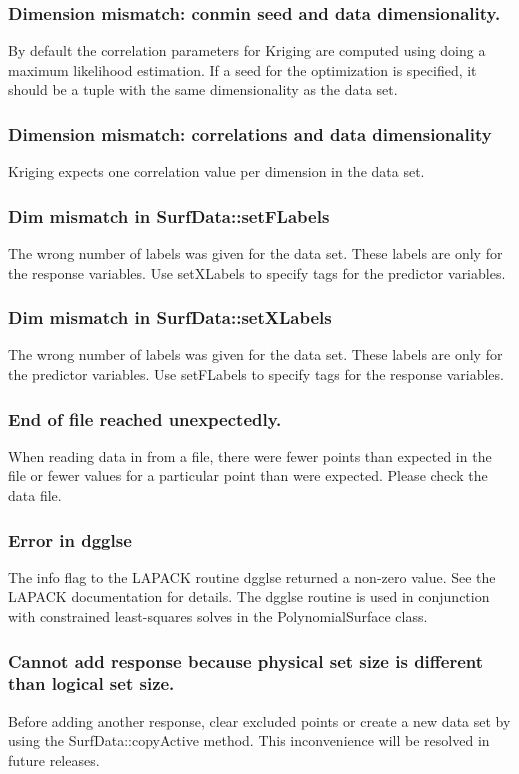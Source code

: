 \documentclass{article}
\begin{document}
\subsubsection{Dimension mismatch: conmin seed and data dimensionality.}
By default the correlation parameters for Kriging are computed using doing a
maximum likelihood estimation.  If a seed for the optimization is specified, it
should be a tuple with the same dimensionality as the data set.

\subsubsection{Dimension mismatch: correlations and data dimensionality}
Kriging expects one correlation value per dimension in the data set.

\subsubsection{Dim mismatch in SurfData::setFLabels}
The wrong number of labels was given for the data set.  These labels are only
for the response variables.  Use setXLabels to specify tags for the predictor
variables.

\subsubsection{Dim mismatch in SurfData::setXLabels}
The wrong number of labels was given for the data set.  These labels are only
for the predictor variables.  Use setFLabels to specify tags for the response
variables.

\subsubsection{End of file reached unexpectedly.}
When reading data in from a file, there were fewer points than expected in the
file or fewer values for a particular point than were expected.  Please check
the data file.

\subsubsection{Error in dgglse}
The info flag to the LAPACK routine dgglse returned a non-zero value.  See the
LAPACK documentation for details.  The dgglse routine is used in conjunction
with constrained least-squares solves in the PolynomialSurface class.

\subsubsection{Cannot add response because physical set size is different than logical set size.}
Before adding another response, clear excluded points or create a new data set
by using the SurfData::copyActive method.  This inconvenience will be resolved
in future releases.
\end{document}
